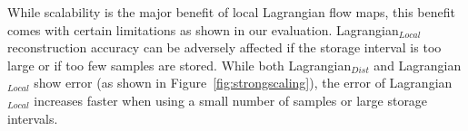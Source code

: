 While scalability is the major benefit of local Lagrangian flow maps, this benefit comes with certain limitations as shown in our evaluation.
%
%
%
Lagrangian$_{Local}$ reconstruction accuracy can be adversely affected if the storage interval is too large or if too few samples are stored.
%
%
%
%
%
%
While both Lagrangian$_{Dist}$ and Lagrangian$_{Local}$ show error (as shown in Figure~\ref{fig:strongscaling}), the error of Lagrangian$_{Local}$ increases faster when using a small number of samples or large storage intervals.
%

